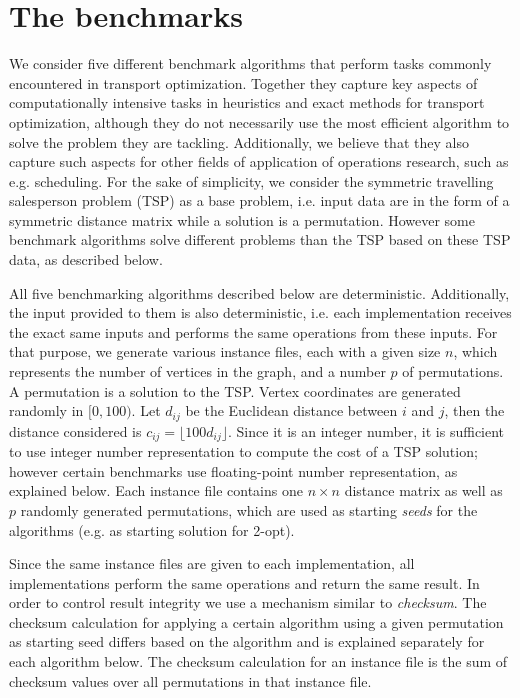 \documentclass[11pt,a4paper,notitlepage]{article}
\begin{document}
\section{The benchmarks}
\label{sec:benchmark}
We consider five different benchmark algorithms that perform tasks
commonly encountered in transport optimization. Together they capture
key aspects of computationally intensive tasks in heuristics and
exact methods for transport optimization, although they do not
necessarily use the most efficient algorithm to solve the problem they
are tackling. Additionally, we believe
that they also capture such aspects for other fields of application
of operations research, such as e.g. scheduling. For the sake of
simplicity, we consider the symmetric travelling salesperson problem
(TSP) as a base problem, i.e. input data are in the form of a
symmetric distance matrix while a solution is a permutation. However
some benchmark algorithms solve different problems than the TSP based on these
TSP data, as described below.

All five benchmarking algorithms described below are deterministic.
Additionally, the input provided to them is also deterministic,
i.e. each implementation receives the exact same inputs and performs
the same operations from these inputs. For that purpose, we generate
various instance files, each with a given size $n$, which represents
the number of vertices in the graph, and a number $p$ of
permutations. A permutation is a solution to the TSP.
Vertex coordinates are generated randomly in $[0, 100)$. Let $d_{ij}$
be the Euclidean distance between $i$ and $j$, then the distance
considered is $c_{ij} = \lfloor 100 d_{ij} \rfloor$. Since it is an
integer number, it is sufficient to use integer number representation
to compute the cost of a TSP solution; however certain benchmarks use
floating-point number representation, as explained below.
Each instance
file contains one $n \times n$ distance matrix as well as $p$ randomly
generated permutations, which are used as starting \emph{seeds} for
the algorithms (e.g. as starting solution for 2-opt).

Since the same instance files are given to 
each implementation, all implementations perform the same operations
and return the same result. In order to control result integrity we use a
mechanism similar to \emph{checksum}. The checksum calculation for
applying a certain algorithm using a given permutation as starting seed differs
based on the algorithm and is explained separately for each algorithm
below. The checksum calculation for an instance file is the sum of
checksum values over all permutations in that instance file.
\end{document}
